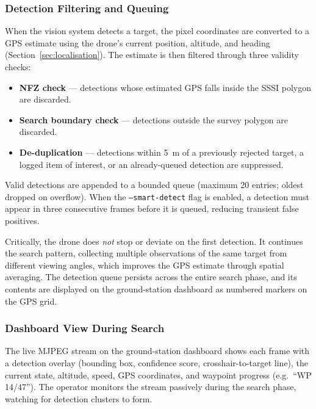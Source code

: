 \subsubsection{Detection Filtering and Queuing}\label{sec:mf-detection}

When the vision system detects a target, the pixel coordinates are converted to a GPS estimate using the drone's current position, altitude, and heading (Section~\ref{sec:localisation}).  The estimate is then filtered through three validity checks:

\begin{itemize}
  \item \textbf{NFZ check} --- detections whose estimated GPS falls inside the SSSI polygon are discarded.
  \item \textbf{Search boundary check} --- detections outside the survey polygon are discarded.
  \item \textbf{De-duplication} --- detections within \SI{5}{\metre} of a previously rejected target, a logged item of interest, or an already-queued detection are suppressed.
\end{itemize}

\noindent Valid detections are appended to a bounded queue (maximum 20 entries; oldest dropped on overflow).  When the \texttt{--smart-detect} flag is enabled, a detection must appear in three consecutive frames before it is queued, reducing transient false positives.

Critically, the drone does \emph{not} stop or deviate on the first detection.  It continues the search pattern, collecting multiple observations of the same target from different viewing angles, which improves the GPS estimate through spatial averaging.  The detection queue persists across the entire search phase, and its contents are displayed on the ground-station dashboard as numbered markers on the GPS grid.

\subsubsection{Dashboard View During Search}

The live MJPEG stream on the ground-station dashboard shows each frame with a detection overlay (bounding box, confidence score, crosshair-to-target line), the current state, altitude, speed, GPS coordinates, and waypoint progress (e.g.\ ``WP 14/47'').  The operator monitors the stream passively during the search phase, watching for detection clusters to form.

